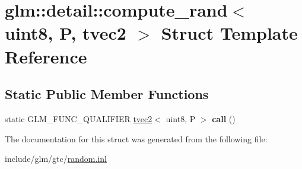 \hypertarget{structglm_1_1detail_1_1compute__rand_3_01uint8_00_01P_00_01tvec2_01_4}{}\section{glm\+:\+:detail\+:\+:compute\+\_\+rand$<$ uint8, P, tvec2 $>$ Struct Template Reference}
\label{structglm_1_1detail_1_1compute__rand_3_01uint8_00_01P_00_01tvec2_01_4}
\subsection*{Static Public Member Functions}
\begin{DoxyCompactItemize}
\item 
\mbox{\label{structglm_1_1detail_1_1compute__rand_3_01uint8_00_01P_00_01tvec2_01_4_aa2d8c5aa8c17ad7e38dfbf9460bde2f5}} 
static G\+L\+M\+\_\+\+F\+U\+N\+C\+\_\+\+Q\+U\+A\+L\+I\+F\+I\+ER \hyperlink{structglm_1_1tvec2}{tvec2}$<$ uint8, P $>$ {\bfseries call} ()
\end{DoxyCompactItemize}


The documentation for this struct was generated from the following file\+:\begin{DoxyCompactItemize}
\item 
include/glm/gtc/\hyperlink{random_8inl}{random.\+inl}\end{DoxyCompactItemize}
